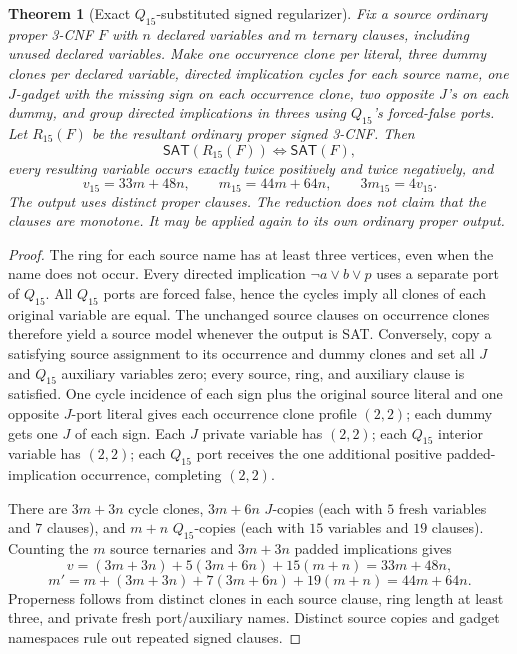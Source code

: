 \documentclass[11pt]{article}
\newtheorem{theorem}{Theorem}
\newcommand{\SAT}{\mathsf{SAT}}
\begin{document}
\begin{theorem}[Exact \(Q_{15}\)-substituted signed regularizer]
Fix a source ordinary proper 3-CNF \(F\) with \(n\) declared variables
and \(m\) ternary clauses, including unused declared variables.
Make one occurrence clone per literal, three dummy clones per
declared variable, directed implication cycles for each source name,
one \(J\)-gadget with the missing sign on each occurrence clone,
two opposite \(J\)'s on each dummy, and group directed implications in
threes using \(Q_{15}\)'s forced-false ports. Let \(R_{15}(F)\)
be the resultant \emph{ordinary proper signed} 3-CNF. Then
\[
\SAT(R_{15}(F))\iff\SAT(F),
\]
every resulting variable occurs \emph{exactly} twice positively
and twice negatively, and
\[
\boxed{v_{15}=33m+48n,\qquad
m_{15}=44m+64n,\qquad3m_{15}=4v_{15}.}
\]
The output uses distinct proper clauses. The reduction does not claim
that the clauses are monotone. It may be applied again to its own
ordinary proper output.
\end{theorem}
\begin{proof}
The ring for each source name has at least three vertices, even
when the name does not occur. Every directed implication
\(\neg a\vee b\vee p\) uses a separate port of \(Q_{15}\).
All \(Q_{15}\) ports are forced false, hence the cycles imply all
clones of each original variable are equal. The unchanged source
clauses on occurrence clones therefore yield a source model
whenever the output is SAT. Conversely, copy a satisfying source
assignment to its occurrence and dummy clones and set all \(J\)
and \(Q_{15}\) auxiliary variables zero; every source, ring, and
auxiliary clause is satisfied. One cycle incidence of each sign
plus the original source literal and one opposite \(J\)-port literal
gives each occurrence clone profile \((2,2)\);
each dummy gets one \(J\) of each sign. Each \(J\) private variable
has \((2,2)\); each \(Q_{15}\) interior variable has \((2,2)\);
each \(Q_{15}\) port receives the one additional positive
padded-implication occurrence, completing \((2,2)\).

There are \(3m+3n\) cycle clones, \(3m+6n\) \(J\)-copies
(each with \(5\) fresh variables and \(7\) clauses), and \(m+n\)
\(Q_{15}\)-copies (each with \(15\) variables and \(19\) clauses).
Counting the \(m\) source ternaries and \(3m+3n\)
padded implications gives
\[
v=(3m+3n)+5(3m+6n)+15(m+n)=33m+48n,
\]
\[
m'=m+(3m+3n)+7(3m+6n)+19(m+n)=44m+64n.
\]
Properness follows from distinct clones in each source clause,
ring length at least three, and private fresh port/auxiliary
names. Distinct source copies and gadget namespaces rule out
repeated signed clauses.
\end{proof}
\end{document}
